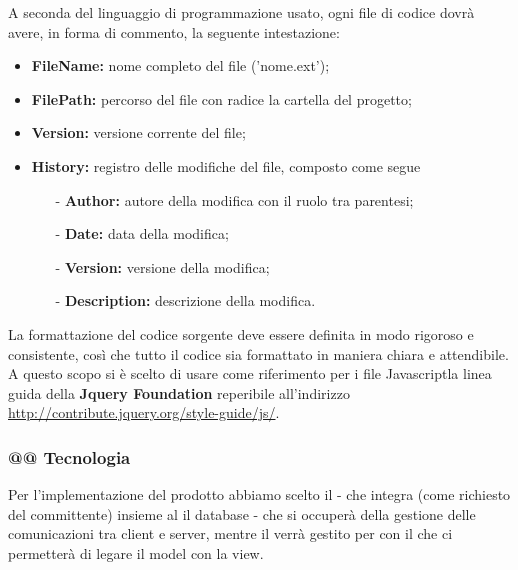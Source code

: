 \documentclass[a4paper,11pt]{article}
\begin{document}
			A seconda del linguaggio di programmazione usato, ogni file di codice dovrà avere, in forma di commento, la seguente intestazione:		
			
		\begin{itemize}
		\item \textbf{FileName:} nome completo del file ('nome.ext');
		\item \textbf{FilePath:} percorso del file con radice la cartella del progetto;
		\item \textbf{Version:} versione corrente del file;
		\item \textbf{History:} registro delle modifiche del file, composto come segue 
			\begin{itemize}
			\item[-] \textbf{Author:} autore della modifica con il ruolo tra parentesi;
			\item[-] \textbf{Date:} data della modifica;
			\item[-] \textbf{Version:} versione della modifica;
			\item[-] \textbf{Description:} descrizione della modifica.
			\end{itemize}	
		\end{itemize}
		
		La formattazione del codice sorgente deve essere definita in modo rigoroso e consistente, così
che tutto il codice sia formattato in maniera chiara e attendibile. A questo scopo si è scelto di usare come riferimento per i file Javascript\addglos  la linea guida della \textbf{Jquery Foundation} reperibile all'indirizzo \url{http://contribute.jquery.org/style-guide/js/}.
	
	\subsubsection{@@ Tecnologia}
	Per l'implementazione del prodotto abbiamo scelto il  - che integra  (come richiesto del committente) insieme al il database  - che si occuperà della gestione delle comunicazioni tra client e server, mentre il  verrà gestito per con il   che ci permetterà di legare il model con la view.
	
	
\end{document}
